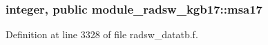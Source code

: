 \subsubsection[{\texorpdfstring{msa17}{msa17}}]{\setlength{\rightskip}{0pt plus 5cm}integer, public module\+\_\+radsw\+\_\+kgb17\+::msa17}\hypertarget{namespacemodule__radsw__kgb17_ac139ff93555c22e658cb767fa7142e08}{}\label{namespacemodule__radsw__kgb17_ac139ff93555c22e658cb767fa7142e08}


Definition at line 3328 of file radsw\+\_\+datatb.\+f.

